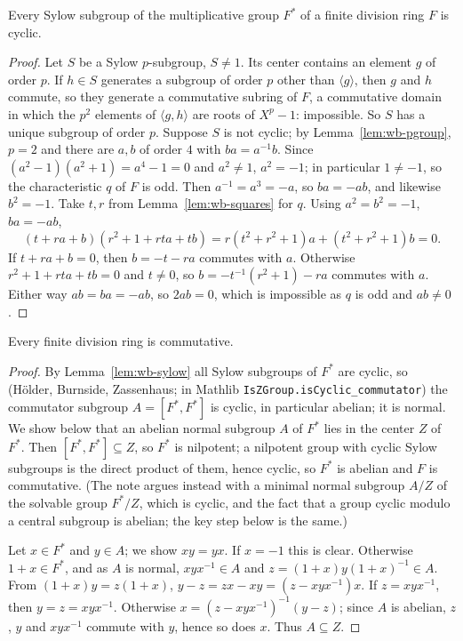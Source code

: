 \begin{lemma}\label{lem:wb-sylow}
Every Sylow subgroup of the multiplicative group $F^*$ of a finite division ring $F$ is cyclic.
\end{lemma}
\begin{proof}
Let $S$ be a Sylow $p$-subgroup, $S\ne1$. Its center contains an element $g$ of order $p$. If $h\in S$ generates a subgroup of order
$p$ other than $\langle g\rangle$, then $g$ and $h$ commute, so they generate a commutative subring of $F$, a commutative domain in
which the $p^2$ elements of $\langle g,h\rangle$ are roots of $X^p-1$: impossible. So $S$ has a unique subgroup of order $p$.
Suppose $S$ is not cyclic; by Lemma~\ref{lem:wb-pgroup}, $p=2$ and there are $a,b$ of order $4$ with $ba=a^{-1}b$. Since
$(a^2-1)(a^2+1)=a^4-1=0$ and $a^2\ne1$, $a^2=-1$; in particular $1\ne-1$, so the characteristic $q$ of $F$ is odd. Then
$a^{-1}=a^3=-a$, so $ba=-ab$, and likewise $b^2=-1$. Take $t,r$ from Lemma~\ref{lem:wb-squares} for $q$. Using $a^2=b^2=-1$,
$ba=-ab$,
\[
(t+ra+b)(r^2+1+rta+tb)=r(t^2+r^2+1)a+(t^2+r^2+1)b=0 .
\]
If $t+ra+b=0$, then $b=-t-ra$ commutes with $a$. Otherwise $r^2+1+rta+tb=0$ and $t\ne0$, so $b=-t^{-1}(r^2+1)-ra$ commutes with
$a$. Either way $ab=ba=-ab$, so $2ab=0$, which is impossible as $q$ is odd and $ab\ne0$.
\end{proof}

\begin{theorem}\label{thm:wedderburn}
Every finite division ring is commutative.
\end{theorem}
\begin{proof}
By Lemma~\ref{lem:wb-sylow} all Sylow subgroups of $F^*$ are cyclic, so (H\"older, Burnside, Zassenhaus; in Mathlib
\texttt{IsZGroup.isCyclic\_commutator}) the commutator subgroup $A=[F^*,F^*]$ is cyclic, in particular abelian; it is
normal. We show below that an abelian normal subgroup $A$ of $F^*$ lies in the center $Z$ of $F^*$. Then $[F^*,F^*]\subseteq Z$,
so $F^*$ is nilpotent; a nilpotent group with cyclic Sylow subgroups is the direct product of them, hence cyclic, so $F^*$ is
abelian and $F$ is commutative. (The note argues instead with a minimal normal subgroup $A/Z$ of the solvable group $F^*/Z$,
which is cyclic, and the fact that a group cyclic modulo a central subgroup is abelian; the key step below is the same.)

Let $x\in F^*$ and $y\in A$; we show $xy=yx$. If $x=-1$ this is clear. Otherwise $1+x\in F^*$, and as $A$ is normal,
$xyx^{-1}\in A$ and $z=(1+x)y(1+x)^{-1}\in A$. From $(1+x)y=z(1+x)$, $y-z=zx-xy=(z-xyx^{-1})x$. If $z=xyx^{-1}$, then $y=z=xyx^{-1}$.
Otherwise $x=(z-xyx^{-1})^{-1}(y-z)$; since $A$ is abelian, $z$, $y$ and $xyx^{-1}$ commute with $y$, hence so does $x$. Thus
$A\subseteq Z$.
\end{proof}
